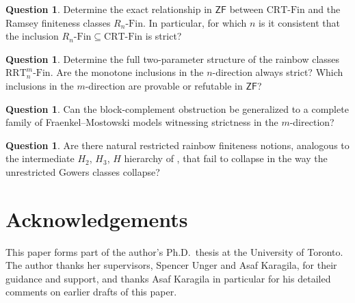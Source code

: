 \documentclass[10pt,a4paper]{amsart}
\theoremstyle{definition}
\newtheorem{question}[theorem]{Question}
\newcommand{\ZF}{\mathsf{ZF}}
\newcommand{\RnFin}[1]{R_{#1}\text{-}\mathrm{Fin}}
\newcommand{\RRT}{\mathrm{RRT}}
\newcommand{\CRT}{\mathrm{CRT}}
\newcommand{\RRTFin}[2]{\RRT^{#1}_{#2}\text{-}\mathrm{Fin}}
\newcommand{\CRTFin}{\CRT\text{-}\mathrm{Fin}}
\begin{document}
\begin{question}
Determine the exact relationship in \(\ZF\) between \(\CRTFin\) and the Ramsey finiteness classes \(\RnFin{n}\).  In particular, for which \(n\) is it consistent that the inclusion \(\RnFin{n}\subseteq\CRTFin\) is strict?
\end{question}

\begin{question}
Determine the full two-parameter structure of the rainbow classes \(\RRTFin{m}{n}\).  Are the monotone inclusions in the \(n\)-direction always strict?  Which inclusions in the \(m\)-direction are provable or refutable in \(\ZF\)?
\end{question}

\begin{question}
Can the block-complement obstruction be generalized to a complete family of Fraenkel--Mostowski models witnessing strictness in the \(m\)-direction?
\end{question}

\begin{question}
Are there natural restricted rainbow finiteness notions, analogous to the intermediate \(H_2\), \(H_3\), \(H\) hierarchy of \cite{BCF}, that fail to collapse in the way the unrestricted Gowers classes collapse?
\end{question}

\section*{Acknowledgements}

This paper forms part of the author's Ph.D.\ thesis at the University of Toronto.  The author thanks her supervisors, Spencer Unger and Asaf Karagila, for their guidance and support, and thanks Asaf Karagila in particular for his detailed comments on earlier drafts of this paper.




\end{document}
